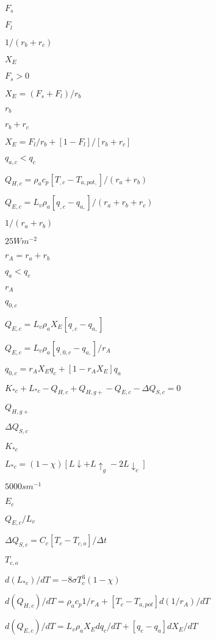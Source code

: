 \documentclass{article}
\begin{document}
{$F_s$
\pagebreak

$F_l$
\pagebreak

$1/(r_b + r_c )$
\pagebreak

$X_E$
\pagebreak

$F_s > 0$
\pagebreak

$X_E = (F_s + F_l )/r_b$
\pagebreak

$r_b$
\pagebreak

$r_b + r_c$
\pagebreak

$X_E = F_l /r_b + [1 - F_l ]/[r_b + r_c ]$
\pagebreak

$q_{a,c} < q_c$
\pagebreak

$Q_{H,c} = \rho_a c_p [T_{,c} - T_{a,pot,} ]/(r_a + r_b )$
\pagebreak

$Q_{E,c} = L_v \rho_a [q_{,c} - q_{a,} ]/(r_a + r_b + r_c )$
\pagebreak

$1/(r_a + r_b )$
\pagebreak

$25 W m^{-2}$
\pagebreak

$r_A = r_a + r_b$
\pagebreak

$q_a < q_c$
\pagebreak

$r_A$
\pagebreak

$q_{0,c}$
\pagebreak

$Q_{E,c} = L_v \rho_a X_E [q_{,c} - q_{a,} ]$
\pagebreak

$Q_{E,c} = L_v \rho_a [q_{,0,c} - q_{a,} ]/r_A$
\pagebreak

$q_{0,c} = r_A X_E q_c + [1 - r_A X_E ]q_a$
\pagebreak

$K_{*c} + L_{*c} - Q_{H,c} + Q_{H,g+} - Q_{E,c} - \Delta Q_{S,c} = 0$
\pagebreak

$Q_{H,g+}$
\pagebreak

$\Delta Q_{S,c}$
\pagebreak

$K_{*c}$
\pagebreak

$L_{*c} = (1 - \chi) [L \downarrow + L \uparrow_g - 2 L \downarrow_c ]$
\pagebreak

$5000 s m^{-1}$
\pagebreak

$E_c$
\pagebreak

$Q_{E,c} /L_v$
\pagebreak

$\Delta Q_{S,c} = C_c [T_c - T_{c,o} ]/ \Delta t$
\pagebreak

$T_{c,o}$
\pagebreak

$d(L_{*c} )/dT = -8 \sigma T_c^3 (1 - \chi)$
\pagebreak

$d(Q_{H,c} )/dT = \rho_a c_p {1/r_A + [T_c - T_{a,pot} ] d(1/r_A )/dT}$
\pagebreak

$d(Q_{E,c} )/dT = L_v \rho_a {X_E dq_c /dT + [q_c - q_a ] dX_E /dT}$
\pagebreak

}
\end{document}
